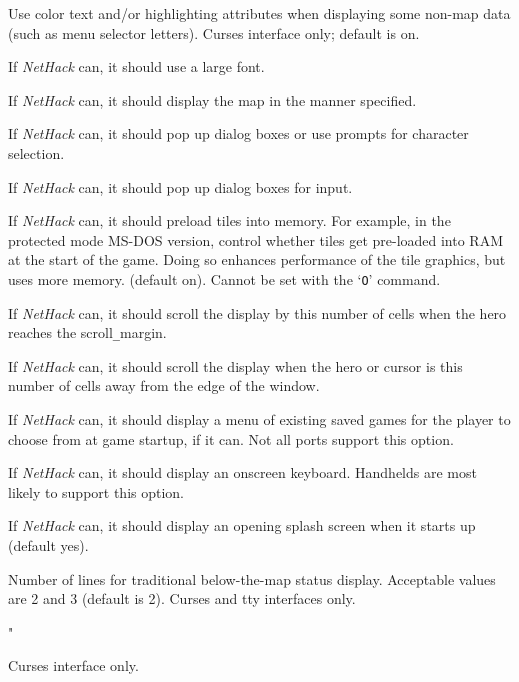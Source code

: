 \item[\ib{guicolor}]
Use color text and/or highlighting attributes when displaying some
non-map data (such as menu selector letters).
Curses interface only; default is on.
\item[\ib{large\verb+_+font}]
If {\it NetHack\/} can, it should use a large font.
\item[\ib{map\verb+_+mode}]
If {\it NetHack\/} can, it should display the map in the manner specified.
\item[\ib{player\verb+_+selection}]
If {\it NetHack\/} can, it should pop up dialog boxes or use prompts for character selection.
\item[\ib{popup\verb+_+dialog}]
If {\it NetHack\/} can, it should pop up dialog boxes for input.
\item[\ib{preload\verb+_+tiles}]
If {\it NetHack\/} can, it should preload tiles into memory.
For example, in the protected mode MS-DOS version, control whether tiles
get pre-loaded into RAM at the start of the game.  Doing so
enhances performance of the tile graphics, but uses more memory. (default on).
Cannot be set with the `{\tt O}' command.
\item[\ib{scroll\verb+_+amount}]
If {\it NetHack\/} can, it should scroll the display by this number of cells
when the hero reaches the scroll\verb+_+margin.
\item[\ib{scroll\verb+_+margin}]
If {\it NetHack\/} can, it should scroll the display when the hero or cursor
is this number of cells away from the edge of the window.
\item[\ib{selectsaved}]
If {\it NetHack\/} can, it should display a menu of existing saved games for the player to
choose from at game startup, if it can. Not all ports support this option.
\item[\ib{softkeyboard}]
If {\it NetHack\/} can, it should display an onscreen keyboard.
Handhelds are most likely to support this option.
\item[\ib{splash\verb+_+screen}]
If {\it NetHack\/} can, it should display an opening splash screen when
it starts up (default yes).
\item[\ib{statuslines}]
Number of lines for traditional below-the-map status display.
Acceptable values are 2 and 3 (default is 2).
Curses and tty interfaces only.
\item[\ib{term\verb+_+cols}\ \ {\it and}]"
\item[\ib{term\verb+_+rows}]
Curses interface only.
